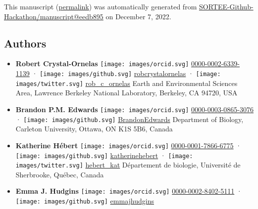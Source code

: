 This manuscript
(\href{https://SORTEE-Github-Hackathon.github.io/manuscript/v/eedb895f5a0d3ccba43cee5d4d3cd457b3a838f9/}{permalink})
was automatically generated
from \href{https://github.com/SORTEE-Github-Hackathon/manuscript/tree/eedb895f5a0d3ccba43cee5d4d3cd457b3a838f9}{SORTEE-Github-Hackathon/manuscript@eedb895}
on December 7, 2022.

\hypertarget{authors}{%
\subsection{Authors}\label{authors}}

\begin{itemize}
\item
  \textbf{Robert Crystal-Ornelas}
  \texttt{[image: images/orcid.svg]}
  \href{https://orcid.org/0000-0002-6339-1139}{0000-0002-6339-1139}
  · \texttt{[image: images/github.svg]}
  \href{https://github.com/robcrystalornelas}{robcrystalornelas}
  · \texttt{[image: images/twitter.svg]}
  \href{https://twitter.com/rob_c_ornelas}{rob\_c\_ornelas}
  Earth and Environmental Sciences Area, Lawrence Berkeley National Laboratory, Berkeley, CA 94720, USA
\item
  \textbf{Brandon P.M. Edwards}
  \texttt{[image: images/orcid.svg]}
  \href{https://orcid.org/0000-0003-0865-3076}{0000-0003-0865-3076}
  · \texttt{[image: images/github.svg]}
  \href{https://github.com/BrandonEdwards}{BrandonEdwards}
  Department of Biology, Carleton University, Ottawa, ON K1S 5B6, Canada
\item
  \textbf{Katherine Hébert}
  \texttt{[image: images/orcid.svg]}
  \href{https://orcid.org/0000-0001-7866-6775}{0000-0001-7866-6775}
  · \texttt{[image: images/github.svg]}
  \href{https://github.com/katherinehebert}{katherinehebert}
  · \texttt{[image: images/twitter.svg]}
  \href{https://twitter.com/hebert_kat}{hebert\_kat}
  Département de biologie, Université de Sherbrooke, Québec, Canada
\item
  \textbf{Emma J. Hudgins}
  \texttt{[image: images/orcid.svg]}
  \href{https://orcid.org/0000-0002-8402-5111}{0000-0002-8402-5111}
  · \texttt{[image: images/github.svg]}
  \href{https://github.com/emmajhudgins}{emmajhudgins}

\end{itemize}
